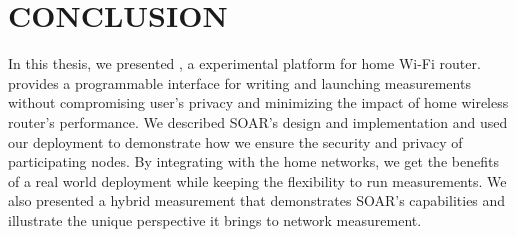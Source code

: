 \chapter{CONCLUSION}
\label{sec.conclusion}
In this thesis, we presented \sysname, a experimental platform for home Wi-Fi router. \sysname provides a programmable interface for writing and launching measurements without compromising user's privacy and minimizing the impact of home wireless router's performance. We described SOAR's design and implementation and used our deployment to demonstrate how we ensure the security and privacy of participating nodes. By integrating \sysname with the home networks, we get the benefits of a real world deployment while keeping the flexibility to run measurements. We also presented a hybrid measurement that demonstrates SOAR's capabilities and illustrate the unique perspective it brings to network measurement. 